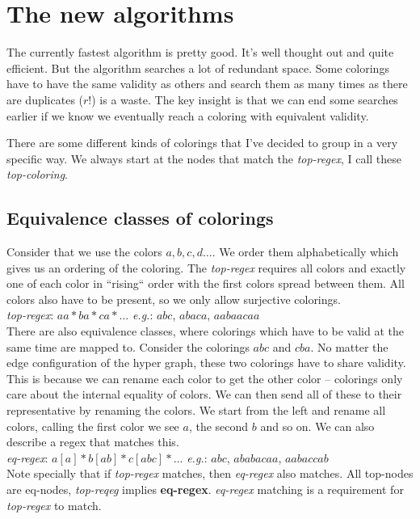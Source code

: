 \documentclass{article}
\begin{document}
\section{The new algorithms}
The currently fastest algorithm is pretty good.
It's well thought out and quite efficient.
But the algorithm searches a lot of redundant space.
Some colorings have to have the same validity as others and search them as many times as there are duplicates ($r!$) is a waste.
The key insight is that we can end some searches earlier if we know we eventually reach a coloring with equivalent validity.


There are some different kinds of colorings that I've decided to group in a very specific way.
We always start at the nodes that match the \textit{top-regex}, I call these \textit{top-coloring}.

\subsection{Equivalence classes of colorings}
Consider that we use the colors $a, b, c, d \dots$. We order them alphabetically which gives us an ordering of the coloring.
The \textit{top-regex} requires all colors and exactly one of each color in ``rising`` order with the first colors spread between them.
All colors also have to be present, so we only allow surjective colorings.
\\[1em]
\textit{top-regex}: $aa*ba*ca*\dots$ \hspace{1em} \textit{e.g.}: $abc$, $abaca$, $aabaacaa$
\\[1em]
There are also equivalence classes, where colorings which have to be valid at the same time are mapped to.
Consider the colorings $abc$ and $cba$. No matter the edge configuration of the hyper graph, these two colorings have to share validity.
This is because we can rename each color to get the other color -- colorings only care about the internal equality of colors.
We can then send all of these to their representative by renaming the colors. We start from the left and rename all colors, calling
the first color we see $a$, the second $b$ and so on. We can also describe a regex that matches this.
\\[1em]
\textit{eq-regex}: $a[a]*b[ab]*c[abc]*\dots$ \hspace{1em} \textit{e.g.}: $abc$, $ababacaa$, $aabaccab$
\\[1em]
Note specially that if \textit{top-regex} matches, then \textit{eq-regex} also matches. All top-nodes are eq-nodes, \textit{top-reqeg} implies \textbf{eq-regex}.
\textit{eq-regex} matching is a requirement for \textit{top-regex} to match.
\end{document}
